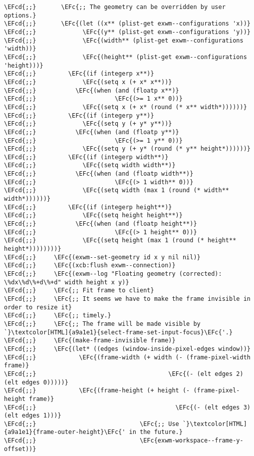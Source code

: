 \documentclass[a4wide,10pt]{article}
\newcommand{\EFc}[1]{\textcolor{EFc}{#1}} %
\newcommand{\EFcd}[1]{\textcolor{EFcd}{#1}} %
\begin{document}
\begin{Code}
\begin{Verbatim}
\EFcd{;;}       \EFc{;; The geometry can be overridden by user options.}
\EFcd{;;}       \EFc{(let ((x** (plist-get exwm--configurations 'x))}
\EFcd{;;}             \EFc{(y** (plist-get exwm--configurations 'y))}
\EFcd{;;}             \EFc{(width** (plist-get exwm--configurations 'width))}
\EFcd{;;}             \EFc{(height** (plist-get exwm--configurations 'height)))}
\EFcd{;;}         \EFc{(if (integerp x**)}
\EFcd{;;}             \EFc{(setq x (+ x* x**))}
\EFcd{;;}           \EFc{(when (and (floatp x**)}
\EFcd{;;}                      \EFc{(>= 1 x** 0))}
\EFcd{;;}             \EFc{(setq x (+ x* (round (* x** width*))))))}
\EFcd{;;}         \EFc{(if (integerp y**)}
\EFcd{;;}             \EFc{(setq y (+ y* y**))}
\EFcd{;;}           \EFc{(when (and (floatp y**)}
\EFcd{;;}                      \EFc{(>= 1 y** 0))}
\EFcd{;;}             \EFc{(setq y (+ y* (round (* y** height*))))))}
\EFcd{;;}         \EFc{(if (integerp width**)}
\EFcd{;;}             \EFc{(setq width width**)}
\EFcd{;;}           \EFc{(when (and (floatp width**)}
\EFcd{;;}                      \EFc{(> 1 width** 0))}
\EFcd{;;}             \EFc{(setq width (max 1 (round (* width** width*))))))}
\EFcd{;;}         \EFc{(if (integerp height**)}
\EFcd{;;}             \EFc{(setq height height**)}
\EFcd{;;}           \EFc{(when (and (floatp height**)}
\EFcd{;;}                      \EFc{(> 1 height** 0))}
\EFcd{;;}             \EFc{(setq height (max 1 (round (* height** height*))))))))}
\EFcd{;;}     \EFc{(exwm--set-geometry id x y nil nil)}
\EFcd{;;}     \EFc{(xcb:flush exwm--connection)}
\EFcd{;;}     \EFc{(exwm--log "Floating geometry (corrected): \%dx\%d\%+d\%+d" width height x y)}
\EFcd{;;}     \EFc{;; Fit frame to client}
\EFcd{;;}     \EFc{;; It seems we have to make the frame invisible in order to resize it}
\EFcd{;;}     \EFc{;; timely.}
\EFcd{;;}     \EFc{;; The frame will be made visible by `}\textcolor[HTML]{a9a1e1}{select-frame-set-input-focus}\EFc{'.}
\EFcd{;;}     \EFc{(make-frame-invisible frame)}
\EFcd{;;}     \EFc{(let* ((edges (window-inside-pixel-edges window))}
\EFcd{;;}            \EFc{(frame-width (+ width (- (frame-pixel-width frame)}
\EFcd{;;}                                     \EFc{(- (elt edges 2) (elt edges 0)))))}
\EFcd{;;}            \EFc{(frame-height (+ height (- (frame-pixel-height frame)}
\EFcd{;;}                                       \EFc{(- (elt edges 3) (elt edges 1)))}
\EFcd{;;}                             \EFc{;; Use `}\textcolor[HTML]{a9a1e1}{frame-outer-height}\EFc{' in the future.}
\EFcd{;;}                             \EFc{exwm-workspace--frame-y-offset))}

\end{Verbatim}
\end{Code}
\end{document}
